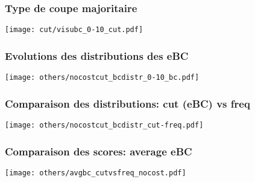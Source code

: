 \documentclass[aspectratio=169]{beamer}
\begin{document}
    \begin{frame}
        \frametitle{Type de coupe majoritaire}
        \texttt{[image: cut/visubc\_0-10\_cut.pdf]}
    \end{frame}

    \begin{frame}
        \frametitle{Evolutions des distributions des eBC}
        \centering
        \texttt{[image: others/nocostcut\_bcdistr\_0-10\_bc.pdf]}
    \end{frame}
    
    \begin{frame}
        \frametitle{Comparaison des distributions: cut (eBC) vs freq}
        \centering
        \texttt{[image: others/nocostcut\_bcdistr\_cut-freq.pdf]}
    \end{frame}

    \begin{frame}
        \frametitle{Comparaison des scores: average eBC}
        \centering
        \texttt{[image: others/avgbc\_cutvsfreq\_nocost.pdf]}
    \end{frame}
\end{document}
